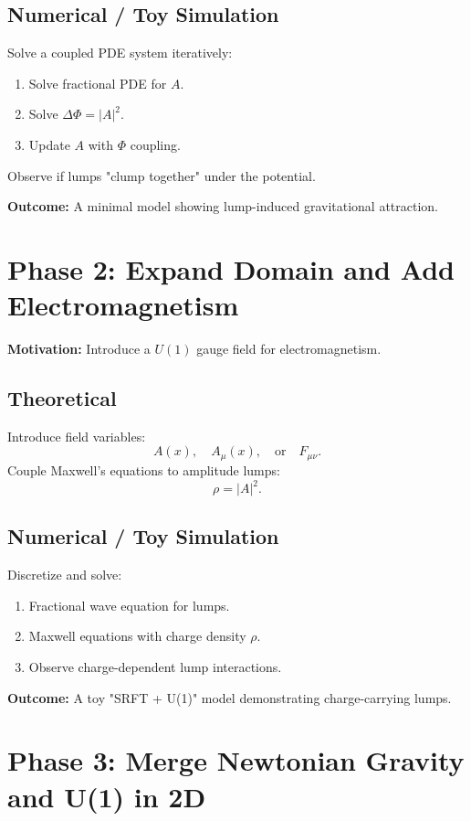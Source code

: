 \documentclass{article}
\begin{document}
\subsection{Numerical / Toy Simulation}
Solve a coupled PDE system iteratively:
\begin{enumerate}
    \item Solve fractional PDE for $A$.
    \item Solve $\Delta \Phi = |A|^2$.
    \item Update $A$ with $\Phi$ coupling.
\end{enumerate}
Observe if lumps "clump together" under the potential.

\textbf{Outcome:} A minimal model showing lump-induced gravitational attraction.

\section{Phase 2: Expand Domain and Add Electromagnetism}

\textbf{Motivation:} Introduce a $U(1)$ gauge field for electromagnetism.

\subsection{Theoretical}
Introduce field variables:
\begin{equation}
    A(x), \quad A_\mu(x), \quad \text{or} \quad F_{\mu \nu}.
\end{equation}
Couple Maxwell's equations to amplitude lumps:
\begin{equation}
    \rho = |A|^2.
\end{equation}

\subsection{Numerical / Toy Simulation}
Discretize and solve:
\begin{enumerate}
    \item Fractional wave equation for lumps.
    \item Maxwell equations with charge density $\rho$.
    \item Observe charge-dependent lump interactions.
\end{enumerate}

\textbf{Outcome:} A toy "SRFT + U(1)" model demonstrating charge-carrying lumps.

\section{Phase 3: Merge Newtonian Gravity and U(1) in 2D}
\end{document}
